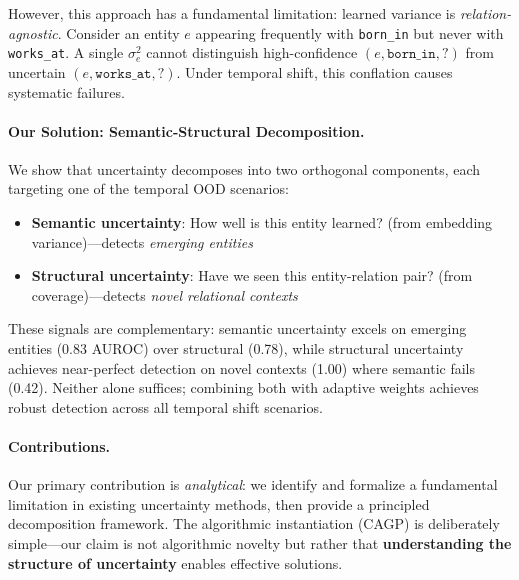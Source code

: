 However, this approach has a fundamental limitation: learned variance is \emph{relation-agnostic}.
Consider an entity $e$ appearing frequently with \texttt{born\_in} but never with \texttt{works\_at}.
A single $\sigma^2_e$ cannot distinguish high-confidence $(e, \texttt{born\_in}, ?)$ from uncertain $(e, \texttt{works\_at}, ?)$.
Under temporal shift, this conflation causes systematic failures.

\paragraph{Our Solution: Semantic-Structural Decomposition.}
We show that uncertainty decomposes into two orthogonal components, each targeting one of the temporal OOD scenarios:
\begin{itemize}
    \item \textbf{Semantic uncertainty}: How well is this entity learned? (from embedding variance)---detects \emph{emerging entities}
    \item \textbf{Structural uncertainty}: Have we seen this entity-relation pair? (from coverage)---detects \emph{novel relational contexts}
\end{itemize}

These signals are complementary: semantic uncertainty excels on emerging entities (0.83 AUROC) over structural (0.78), while structural uncertainty achieves near-perfect detection on novel contexts (1.00) where semantic fails (0.42).
Neither alone suffices; combining both with adaptive weights achieves robust detection across all temporal shift scenarios.

\paragraph{Contributions.}
Our primary contribution is \emph{analytical}: we identify and formalize a fundamental limitation in existing uncertainty methods, then provide a principled decomposition framework. The algorithmic instantiation (CAGP) is deliberately simple---our claim is not algorithmic novelty but rather that \textbf{understanding the structure of uncertainty} enables effective solutions.

